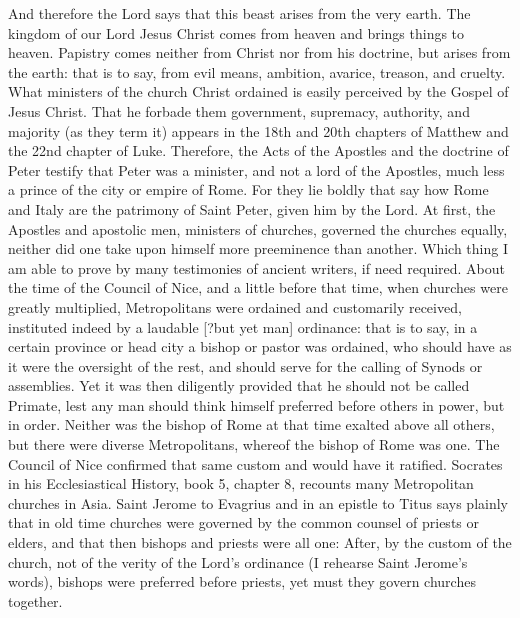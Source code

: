 And therefore the Lord says that this beast arises from the very earth. The kingdom of our Lord Jesus Christ comes from heaven and brings things to heaven. Papistry comes neither from Christ nor from his doctrine, but arises from the earth: that is to say, from evil means, ambition, avarice, treason, and cruelty. What ministers of the church Christ ordained is easily perceived by the Gospel of Jesus Christ. That he forbade them government, supremacy, authority, and majority (as they term it) appears in the 18th and 20th chapters of Matthew and the 22nd chapter of Luke. Therefore, the Acts of the Apostles and the doctrine of Peter testify that Peter was a minister, and not a lord of the Apostles, much less a prince of the city or empire of Rome. For they lie boldly that say how Rome and Italy are the patrimony of Saint Peter, given him by the Lord. At first, the Apostles and apostolic men, ministers of churches, governed the churches equally, neither did one take upon himself more preeminence than another. Which thing I am able to prove by many testimonies of ancient writers, if need required. About the time of the Council of Nice, and a little before that time, when churches were greatly multiplied, Metropolitans were ordained and customarily received, instituted indeed by a laudable [?but yet man] ordinance: that is to say, in a certain province or head city a bishop or pastor was ordained, who should have as it were the oversight of the rest, and should serve for the calling of Synods or assemblies. Yet it was then diligently provided that he should not be called Primate, lest any man should think himself preferred before others in power, but in order. Neither was the bishop of Rome at that time exalted above all others, but there were diverse Metropolitans, whereof the bishop of Rome was one. The Council of Nice confirmed that same custom and would have it ratified. Socrates in his Ecclesiastical History, book 5, chapter 8, recounts many Metropolitan churches in Asia. Saint Jerome to Evagrius and in an epistle to Titus says plainly that in old time churches were governed by the common counsel of priests or elders, and that then bishops and priests were all one: After, by the custom of the church, not of the verity of the Lord’s ordinance (I rehearse Saint Jerome’s words), bishops were preferred before priests, yet must they govern churches together.

